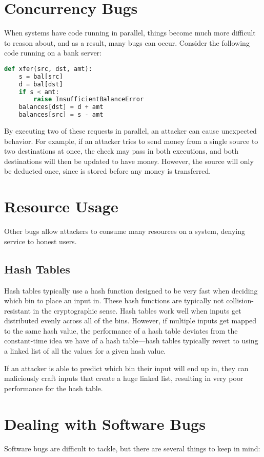 \section{Concurrency Bugs}
When systems have code running in parallel, things become much more difficult to reason about, and as a result, many bugs can occur. Consider the following code running on a bank server:

\begin{lstlisting}[language=python]
def xfer(src, dst, amt):
	s = bal[src]
	d = bal[dst]
	if s < amt:
		raise InsufficientBalanceError
	balances[dst] = d + amt
	balances[src] = s - amt
\end{lstlisting}

By executing two of these  requests in parallel, an attacker can cause unexpected behavior. For example, if an attacker tries to send money from a single source to two destinations at once, the check  may pass in both executions, and both destinations will then be updated to have money. However, the source will only be deducted once, since  is stored before any money is transferred.

\section{Resource Usage}
Other bugs allow attackers to consume many resources on a system, denying service to honest users.

\subsection{Hash Tables}
Hash tables typically use a hash function designed to be very fast when deciding which bin to place an input in. These hash functions are typically not collision-resistant in the cryptographic sense. Hash tables work well when inputs get distributed evenly across all of the bins. However, if multiple inputs get mapped to the same hash value, the performance of a hash table deviates from the constant-time idea we have of a hash table---hash tables typically revert to using a linked list of all the values for a given hash value.

If an attacker is able to predict which bin their input will end up in, they can maliciously craft inputs that create a huge linked list, resulting in very poor performance for the hash table.

\section{Dealing with Software Bugs}
Software bugs are difficult to tackle, but there are several things to keep in mind:

